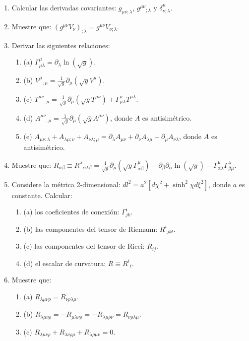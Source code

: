 \documentclass[a4paper,12pt]{article}
\begin{document}
\begin{enumerate}
    \item Calcular las derivadas covariantes: $g_{\mu\nu;\lambda}$, $g^{\mu\nu}{}_{;\lambda}$ y $\delta^\mu_{\nu;\lambda}$.

    \item Muestre que: $(g^{\mu\nu} V_\nu)_{;\lambda} = g^{\mu\nu} V_{\nu;\lambda}$.

    \item Derivar las siguientes relaciones:
    \begin{enumerate}
        \item (a) $\Gamma^\mu_{\mu\lambda} = \partial_\lambda \ln(\sqrt{g})$.
        \item (b) $V^\mu{}_{;\mu} = \frac{1}{\sqrt{g}} \partial_\mu (\sqrt{g} V^\mu)$.
        \item (c) $T^{\mu\nu}{}_{;\mu} = \frac{1}{\sqrt{g}} \partial_\mu (\sqrt{g} T^{\mu\nu}) + \Gamma^\nu_{\mu\lambda} T^{\mu\lambda}$.
        \item (d) $A^{\mu\nu}{}_{;\mu} = \frac{1}{\sqrt{g}} \partial_\mu (\sqrt{g} A^{\mu\nu})$, donde $A$ es antisimétrico.
        \item (e) $A_{\mu\nu;\lambda} + A_{\lambda\mu;\nu} + A_{\nu\lambda;\mu} = \partial_\lambda A_{\mu\nu} + \partial_\nu A_{\lambda\mu} + \partial_\mu A_{\nu\lambda}$, donde $A$ es antisimétrico.
    \end{enumerate}

    \item Muestre que: $R_{\alpha\beta} \equiv R^\lambda{}_{\alpha\lambda\beta} = \frac{1}{\sqrt{g}} \partial_\mu (\sqrt{g} \Gamma^\mu_{\alpha\beta}) - \partial_\beta \partial_\alpha \ln(\sqrt{g}) - \Gamma^\mu_{\alpha\lambda} \Gamma^\lambda_{\beta\mu}$.

    \item Considere la métrica 2-dimensional: $dl^2 = a^2 [d\chi^2 + \sinh^2 \chi d\xi^2]$, donde $a$ es constante. Calcular:
    \begin{enumerate}
        \item (a) los coeficientes de conexión: $\Gamma^i_{jk}$.
        \item (b) las componentes del tensor de Riemann: $R^i{}_{jkl}$.
        \item (c) las componentes del tensor de Ricci: $R_{ij}$.
        \item (d) el escalar de curvatura: $R \equiv R^i{}_i$.
    \end{enumerate}

    \item Muestre que:
    \begin{enumerate}
        \item (a) $R_{\lambda\mu\nu\rho} = R_{\nu\rho\lambda\mu}$.
        \item (b) $R_{\lambda\mu\nu\rho} = -R_{\mu\lambda\nu\rho} = -R_{\lambda\mu\rho\nu} = R_{\nu\rho\lambda\mu}$.
        \item (c) $R_{\lambda\mu\nu\rho} + R_{\lambda\nu\rho\mu} + R_{\lambda\rho\mu\nu} = 0$.
    \end{enumerate}
\end{enumerate}
\end{document}
